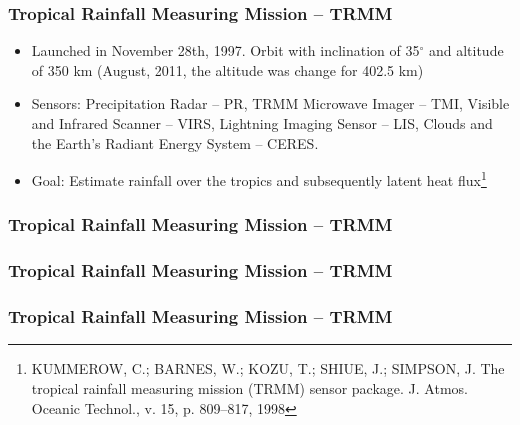 \documentclass[smaller]{beamer}
\begin{document}
\begin{frame}
\frametitle{Tropical Rainfall Measuring Mission -- TRMM}
\begin{itemize}
\item Launched in November 28th, 1997. Orbit with inclination of 35$^{\circ}$ and altitude of 350 km (August, 2011, the altitude was change for 402.5 km)
\item Sensors: Precipitation Radar
-- PR, TRMM Microwave Imager -- TMI, Visible and Infrared Scanner -- VIRS, Lightning Imaging Sensor -- LIS,  Clouds and the Earth’s Radiant Energy System
-- CERES.
\item Goal: Estimate rainfall over the  tropics and subsequently latent heat flux\footnote{KUMMEROW, C.; BARNES, W.; KOZU, T.; SHIUE, J.; SIMPSON, J. The tropical
rainfall measuring mission (TRMM) sensor package. J. Atmos. Oceanic Technol., v. 15, p. 809--817, 1998}
\end{itemize}
\end{frame} 

\begin{frame}
\frametitle{Tropical Rainfall Measuring Mission -- TRMM}

\end{frame}


\begin{frame}
\frametitle{Tropical Rainfall Measuring Mission -- TRMM}

\end{frame}

\begin{frame}
\frametitle{Tropical Rainfall Measuring Mission -- TRMM}

\end{frame}






%
 
\end{document}
